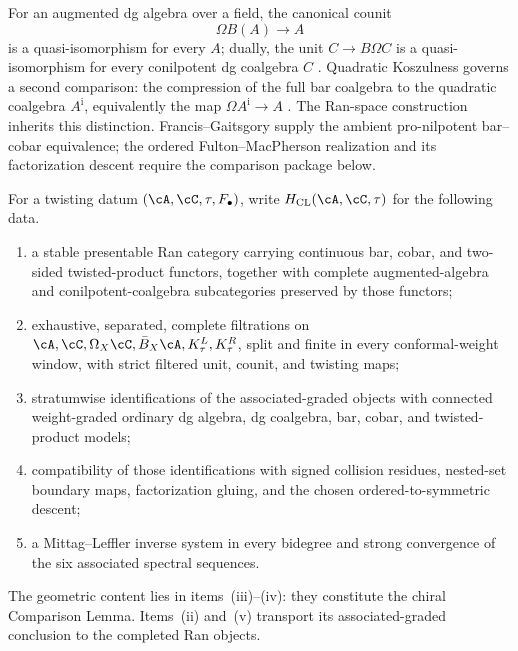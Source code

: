 \begin{remark}
\label{rem:construction-vs-resolution}
For an augmented dg algebra over a field, the canonical counit
\[
 \Omega B(A)\longrightarrow A
\]
is a quasi-isomorphism for every \(A\); dually, the unit
\(C\to B\Omega C\) is a quasi-isomorphism for every conilpotent dg
coalgebra \(C\)
\cite[Corollary~2.3.4]{LodayVallette12}.  Quadratic Koszulness governs
a second comparison: the compression of the full bar coalgebra to the
quadratic coalgebra \(A^{\mathrm i}\), equivalently the map
\(\Omega A^{\mathrm i}\to A\)
\cite[Theorem~3.4.6]{LodayVallette12}.  The Ran-space construction
inherits this distinction.  Francis--Gaitsgory supply the ambient
pro-nilpotent bar--cobar equivalence; the ordered
Fulton--MacPherson realization and its factorization descent require
the comparison package below.
\end{remark}

\begin{definition}
\label{def:chiral-comparison-lemma-package}
For a twisting datum \((\cA,\cC,\tau,F_\bullet)\), write
\(H_{\mathrm{CL}}(\cA,\cC,\tau)\) for the following data.
\begin{enumerate}[label=\textup{(\roman*)},leftmargin=*]
\item a stable presentable Ran category carrying continuous bar,
 cobar, and two-sided twisted-product functors, together with complete
 augmented-algebra and conilpotent-coalgebra subcategories preserved by
 those functors;
\item exhaustive, separated, complete filtrations on
 \(\cA,\cC,\Omega_X\cC,\bar B_X\cA,K_\tau^L,K_\tau^R\), split and
 finite in every conformal-weight window, with strict filtered unit,
 counit, and twisting maps;
\item stratumwise identifications of the associated-graded objects
 with connected weight-graded ordinary dg algebra, dg coalgebra, bar,
 cobar, and twisted-product models;
\item compatibility of those identifications with signed collision
 residues, nested-set boundary maps, factorization gluing, and the
 chosen ordered-to-symmetric descent;
\item a Mittag--Leffler inverse system in every bidegree and strong
 convergence of the six associated spectral sequences.
\end{enumerate}
The geometric content lies in items~\textup{(iii)}--\textup{(iv)}:
they constitute the chiral Comparison Lemma.  Items~\textup{(ii)}
and~\textup{(v)} transport its associated-graded conclusion to the
completed Ran objects.
\end{definition}

